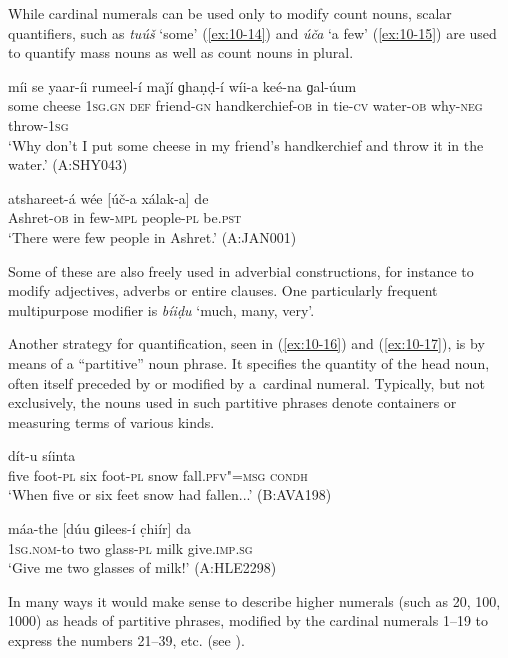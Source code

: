 While cardinal numerals can be used only to modify count nouns, scalar quantifiers, such as \textit{tuúš} `some' (\ref{ex:10-14}) and \textit{úča} `a few' (\ref{ex:10-15}) are used to quantify mass nouns as well as count nouns in plural. 

\begin{exe}
\ex
\label{ex:10-14}
 míi se yaar-íi rumeel-í maǰí ɡhaṇḍ-í wíi-a keé-na ɡal-úum \\
some cheese \textsc{1sg.gn} \textsc{def} friend-\textsc{gn} handkerchief-\textsc{ob}  in tie-\textsc{cv} water-\textsc{ob} why-\textsc{neg} throw-\textsc{1sg} \\
\glt `Why don't I put some cheese in my friend's handkerchief and throw it in the water.' (A:SHY043)

\ex
\label{ex:10-15}
\gll atshareet-á wée [úč-a xálak-a] de \\
Ashret-\textsc{ob} in few-\textsc{mpl} people-\textsc{pl} be.\textsc{pst} \\
\glt `There were few people in Ashret.' (A:JAN001)
\end{exe}

Some of these are also freely used in adverbial constructions, for instance to modify adjectives, adverbs or entire clauses. One particularly frequent multipurpose modifier is \textit{bíiḍu} `much, many, very'.


Another strategy for quantification, seen in (\ref{ex:10-16}) and (\ref{ex:10-17}), is by means of a ``partitive'' noun phrase. It specifies the quantity of the head noun, often itself preceded by or modified by a~cardinal numeral. Typically, but not exclusively, the nouns used in such partitive phrases denote containers or measuring terms of various kinds.

\begin{exe}
\ex
\label{ex:10-16}
 dít-u síinta \\
five foot-\textsc{pl} six foot-\textsc{pl} snow fall.\textsc{pfv"=msg} \textsc{condh} \\
\glt `When five or six feet snow had fallen...' (B:AVA198)

\ex
\label{ex:10-17}
\gll máa-the [dúu ɡilees-í c̣hiír] da \\
\textsc{1sg}.\textsc{nom}-to two glass-\textsc{pl} milk give.\textsc{imp.sg} \\
\glt `Give me two glasses of milk!' (A:HLE2298)
\end{exe}

In many ways it would make sense to describe higher numerals (such as 20, 100, 1000) as heads of partitive phrases, modified by the cardinal numerals 1--19 to express the numbers 21--39, etc. (see ).


